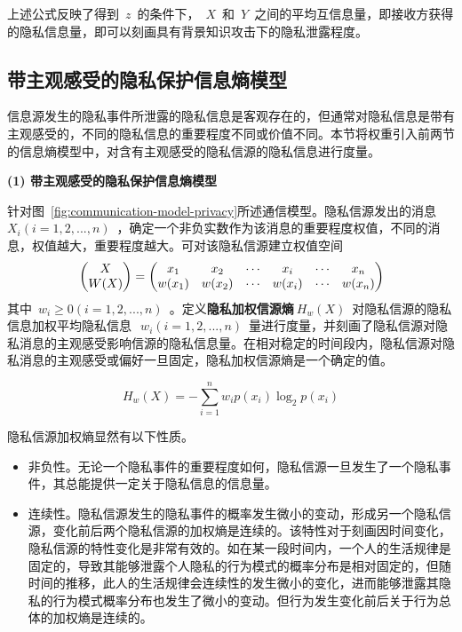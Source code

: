 上述公式反映了得到~$z$~的条件下，~$X$~和~$Y$~之间的平均互信息量，即接收方获得的隐私信息量，即可以刻画具有背景知识攻击下的隐私泄露程度。

\subsection{带主观感受的隐私保护信息熵模型}

信息源发生的隐私事件所泄露的隐私信息是客观存在的，但通常对隐私信息是带有主观感受的，不同的隐私信息的重要程度不同或价值不同。本节将权重引入前两节的信息熵模型中，对含有主观感受的隐私信源的隐私信息进行度量。

\textbf{(1) 带主观感受的隐私保护信息熵模型}

针对图~\ref{fig:communication-model-privacy}所述通信模型。隐私信源发出的消息~$X_{i}(i=1,2,...,n)$~，确定一个非负实数作为该消息的重要程度权值，不同的消息，权值越大，重要程度越大。可对该隐私信源建立权值空间
\begin{equation}
\centering
\begin{split}
&\begin{pmatrix}
X\\ 
W(X)
\end{pmatrix}=\begin{pmatrix}
x_{1} & x_{2} & \cdots  & x_{i} & \cdots  & x_{n}\\ 
w(x_{1})& w(x_{2}) & \cdots & w(x_{i}) & \cdots & w(x_{n})
\end{pmatrix} \\
\end{split}
\end{equation}
其中~$w_{i}\geqslant 0(i=1,2,...,n)$~。定义\textbf{隐私加权信源熵}$~H_{w}(X)$~对隐私信源的隐私信息加权平均隐私信息~$~w_{i}(i=1,2,...,n)$~量进行度量，并刻画了隐私信源对隐私消息的主观感受影响信源的隐私信息量。在相对稳定的时间段内，隐私信源对隐私消息的主观感受或偏好一旦固定，隐私加权信源熵是一个确定的值。

\begin{equation}
H_{w}(X)=-\sum_{i=1}^{n}w_{i}p(x_{i})\log_{2}p(x_{i})
\end{equation}

隐私信源加权熵显然有以下性质。
\begin{itemize}
	\item 非负性。无论一个隐私事件的重要程度如何，隐私信源一旦发生了一个隐私事件，其总能提供一定关于隐私信息的信息量。
	\item 连续性。隐私信源发生的隐私事件的概率发生微小的变动，形成另一个隐私信源，变化前后两个隐私信源的加权熵是连续的。该特性对于刻画因时间变化，隐私信源的特性变化是非常有效的。如在某一段时间内，一个人的生活规律是固定的，导致其能够泄露个人隐私的行为模式的概率分布是相对固定的，但随时间的推移，此人的生活规律会连续性的发生微小的变化，进而能够泄露其隐私的行为模式概率分布也发生了微小的变动。但行为发生变化前后关于行为总体的加权熵是连续的。
\end{itemize}

